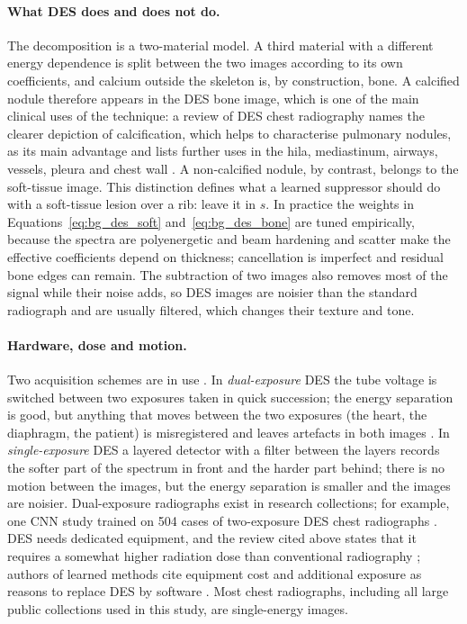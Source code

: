 \paragraph{What DES does and does not do.} The decomposition is a two-material model. A third material with a different energy dependence is
split between the two images according to its own coefficients, and calcium outside the skeleton is, by construction, bone. A calcified nodule
therefore appears in the DES bone image, which is one of the main clinical uses of the technique: a review of DES chest radiography names the
clearer depiction of calcification, which helps to characterise pulmonary nodules, as its main advantage and lists further uses in the hila,
mediastinum, airways, vessels, pleura and chest wall \citep{kuhlman2006des}. A non-calcified nodule, by contrast, belongs to the soft-tissue
image. This distinction defines what a learned suppressor should do with a soft-tissue lesion over a rib: leave it in $s$. In practice the
weights in Equations~\eqref{eq:bg_des_soft} and~\eqref{eq:bg_des_bone} are tuned empirically, because the spectra are polyenergetic and beam
hardening and scatter make the effective coefficients depend on thickness; cancellation is imperfect and residual bone edges can remain. The
subtraction of two images also removes most of the signal while their noise adds, so DES images are noisier than the standard radiograph and are
usually filtered, which changes their texture and tone.

\paragraph{Hardware, dose and motion.} Two acquisition schemes are in use \citep{schaeferprokop2008digital}. In \emph{dual-exposure} DES the tube voltage is switched between two exposures taken in quick succession; the energy separation is
good, but anything that moves between the two exposures (the heart, the diaphragm, the patient) is misregistered and leaves artefacts in both
images \citep{schaeferprokop2008digital}. In \emph{single-exposure} DES a layered detector with a filter between the layers
records the softer part of the spectrum in front and the harder part behind; there is no motion between the images, but the energy separation is
smaller and the images are noisier. Dual-exposure radiographs exist in research collections; for example, one CNN study trained on 504 cases of
two-exposure DES chest radiographs \citep{yang2017cascade}. DES needs dedicated equipment, and the review cited above states that it requires a
somewhat higher radiation dose than conventional radiography \citep{kuhlman2006des}; authors of learned methods cite equipment cost and
additional exposure as reasons to replace DES by software \citep{chen2024bsdiff}. Most chest radiographs, including all large public
collections used in this study, are single-energy images.

